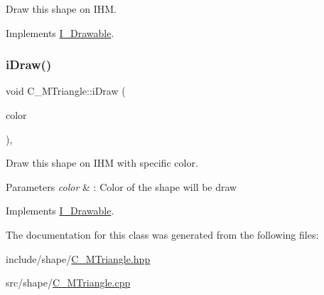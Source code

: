 Draw this shape on I\+HM. 



Implements \hyperlink{classI__Drawable_ae24c65000977a805f52ce032321cd86f}{I\+\_\+\+Drawable}.

\mbox{\label{classC__MTriangle_a049e6026145865387db4244678336784}} 
\subsubsection{\texorpdfstring{i\+Draw()}{iDraw()}\hspace{0.1cm}{\footnotesize\ttfamily [2/2]}}
{\footnotesize\ttfamily void C\+\_\+\+M\+Triangle\+::i\+Draw (\begin{DoxyParamCaption}\item[{M\+L\+V\+\_\+\+Color}]{color }\end{DoxyParamCaption})\hspace{0.3cm}{\ttfamily [override]}, {\ttfamily [virtual]}}



Draw this shape on I\+HM with specific color. 


\begin{DoxyParams}{Parameters}
{\em color} & \+: Color of the shape will be draw \\
\hline
\end{DoxyParams}


Implements \hyperlink{classI__Drawable_a25f6474325614c451a91f019e5fe8010}{I\+\_\+\+Drawable}.



The documentation for this class was generated from the following files\+:\begin{DoxyCompactItemize}
\item 
include/shape/\hyperlink{C__MTriangle_8hpp}{C\+\_\+\+M\+Triangle.\+hpp}\item 
src/shape/\hyperlink{C__MTriangle_8cpp}{C\+\_\+\+M\+Triangle.\+cpp}\end{DoxyCompactItemize}
